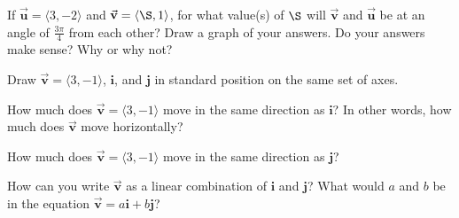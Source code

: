 \bq If $\vec{\textbf{u}}=\langle 3,-2\rangle$ and $\vec{\textbf{v}}=\langle \S,1\rangle$, for what value(s) of $\S$ will $\vec{\textbf{v}}$ and $\vec{\textbf{u}}$ be at an angle of $\frac{3 \pi}{4}$ from each other? Draw a graph of your answers. Do your answers make sense? Why or why not?
\eq

\bq\label{wert} \be
\item Draw $\vec{\textbf{v}}=\langle 3,-1\rangle$, $\textbf{i}$, and $\textbf{j}$ in standard position on the same set of axes.
\item How much does $\vec{\textbf{v}}=\langle 3,-1\rangle$ move in the same direction as $\textbf{i}$? In other words, how much does $\vec{\textbf{v}}$ move horizontally?
\item How much does $\vec{\textbf{v}}=\langle 3,-1\rangle$ move in the same direction as $\textbf{j}$?
\item How can you write $\vec{\textbf{v}}$ as a linear combination of $\textbf{i}$ and $\textbf{j}$? What would $a$ and $b$ be in the equation $\vec{\textbf{v}}= a \textbf{i}+b \textbf{j}$?
\ee
\eq

